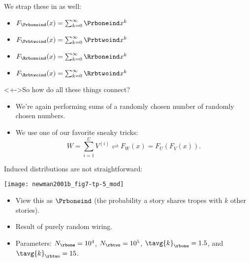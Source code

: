 \begin{frame}

  \begin{block}{We strap these in as well:}
    \begin{itemize}
    \item<+->
      $
      F_{\Prboneind}(x)
      =
      \sum_{k=0}^{\infty}
      \Prboneind x^k
      $
    \item<+->
      $
      F_{\Prbtwoind}(x)
      =
      \sum_{k=0}^{\infty}
      \Prbtwoind x^k
      $
    \item<+->
      $
      F_{\Rrboneind}(x)
      =
      \sum_{k=0}^{\infty}
      \Rrboneind x^k
      $
    \item<+->
      $
      F_{\Rrbtwoind}(x)
      =
      \sum_{k=0}^{\infty}
      \Rrbtwoind x^k
      $
    \end{itemize}
  \end{block}

  \begin{block}<+->{So how do all these things connect?}
    \begin{itemize}
    \item<+->
      We're again performing sums of a randomly chosen number
      of randomly chosen numbers.
    \item<+->
      We use one of our favorite sneaky tricks:
      $$
      W 
      = 
      \sum_{i=1}^{U} V^{(i)}
      \rightleftharpoons
      F_W(x)
      =
      F_U(F_V(x)).
      $$
    \end{itemize}
  \end{block}
\end{frame}

\begin{frame}

  \begin{block}{Induced distributions are not straightforward:}
    \begin{center}
      \texttt{[image: newman2001b\_fig7-tp-5\_mod]}
    \end{center}
    \begin{itemize}
    \item 
      View this as $\Prboneind$ (the probability a story shares tropes
      with $k$ other stories).\cite{newman2001b}
    \item 
      Result of purely random wiring.
    \item 
      Parameters: 
      $N_\rbone = 10^4$,
      $N_\rbtwo = 10^5$,\newline
      $\tavg{k}_\rbone = 1.5$,
      and
      $\tavg{k}_\rbtwo = 15$.
    \end{itemize}
  \end{block}
  
\end{frame}

